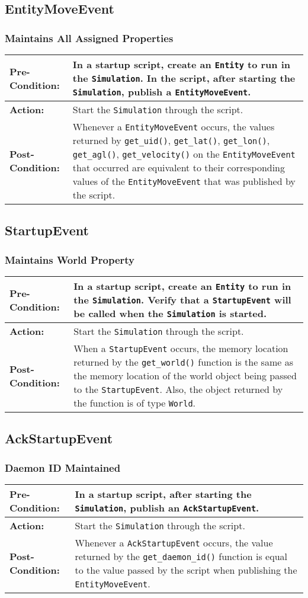 \documentclass[titlepage]{article}
\newcommand{\testcase}[3]{
    \begin{center}
    \begin{tabular}{| l | p{0.7\textwidth}|}
        \hline
        \rowcolor[gray]{0.8}\textbf{Pre-Condition:} & #1 \\ \hline
        \textbf{Action:} & #2 \\ \hline
        \rowcolor[gray]{0.8}\textbf{Post-Condition:} & #3 \\ \hline
    \end{tabular}
    \end{center}
}
\begin{document}
\subsection{EntityMoveEvent}
\subsubsection{Maintains All Assigned Properties}
\testcase{In a startup script, create an \texttt{Entity} to run in the \texttt{Simulation}.  In the script, after starting the \texttt{Simulation}, publish a \texttt{EntityMoveEvent}.}{Start the \texttt{Simulation} through the script.}{Whenever a \texttt{EntityMoveEvent} occurs, the values returned by \texttt{get\_uid()}, \texttt{get\_lat()}, \texttt{get\_lon()}, \texttt{get\_agl()}, \texttt{get\_velocity()} on the \texttt{EntityMoveEvent} that occurred are equivalent to their corresponding values of the \texttt{EntityMoveEvent} that was published by the script.}

\subsection{StartupEvent}
\subsubsection{Maintains World Property}
\testcase{In a startup script, create an \texttt{Entity} to run in the \texttt{Simulation}.  Verify that a \texttt{StartupEvent} will be called when the \texttt{Simulation} is started.}{Start the \texttt{Simulation} through the script.}{When a \texttt{StartupEvent} occurs, the memory location returned by the \texttt{get\_world()} function is the same as the memory location of the world object being passed to the \texttt{StartupEvent}. Also, the object returned by the function is of type \texttt{World}.}

\subsection{AckStartupEvent}
\subsubsection{Daemon ID Maintained}
\testcase{In a startup script, after starting the \texttt{Simulation}, publish an \texttt{AckStartupEvent}.}{Start the \texttt{Simulation} through the script.}{Whenever a \texttt{AckStartupEvent} occurs, the value returned by the \texttt{get\_daemon\_id()} function is equal to the value passed by the script when publishing the \texttt{EntityMoveEvent}.}
\end{document}
